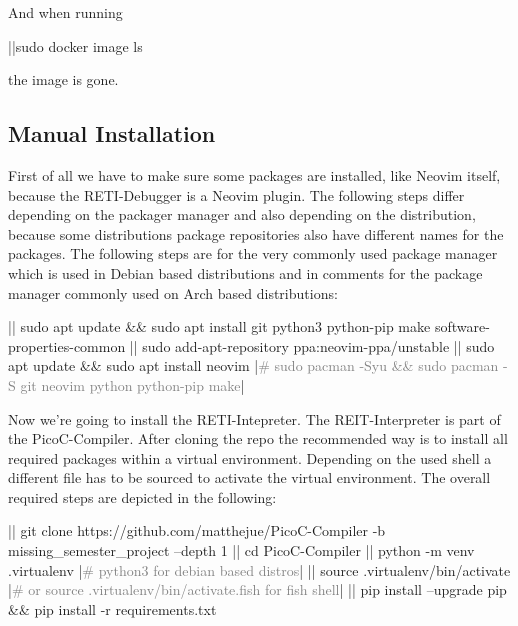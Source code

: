 \documentclass{report}
\begin{document}
And when running

\begin{terminal}
	|\prompt|sudo docker image ls
\end{terminal}

the image is gone.

\subsection{Manual Installation}
\label{sec:manual installation}

First of all we have to make sure some packages are installed, like Neovim itself, because the RETI-Debugger is a Neovim plugin. The following steps differ depending on the packager manager and also depending on the distribution, because some distributions package repositories also have different names for the packages. The following steps are for the very commonly used package manager  which is used in Debian based distributions and in comments for the  package manager commonly used on Arch based distributions:

\begin{terminal}
  |\prompt| sudo apt update && sudo apt install git python3 python-pip make 
     software-properties-common
  |\prompt| sudo add-apt-repository ppa:neovim-ppa/unstable
  |\prompt| sudo apt update && sudo apt install neovim
  |\textcolor{gray}{# sudo pacman -Syu && sudo pacman -S git neovim python python-pip make}|
\end{terminal}

Now we're going to install the RETI-Intepreter. The REIT-Interpreter is part of the PicoC-Compiler. After cloning the repo the recommended way is to install all required packages within a \alert{virtual environment}. Depending on the used \alert{shell} a different file has to be sourced to activate the virtual environment. The overall required steps are depicted in the following:

\begin{terminal}
|\prompt| git clone https://github.com/matthejue/PicoC-Compiler
   -b missing_semester_project --depth 1
|\prompt| cd PicoC-Compiler
|\prompt| python -m venv .virtualenv |\textcolor{gray}{# python3 for debian based distros}|
|\prompt| source .virtualenv/bin/activate
|\textcolor{gray}{# or source .virtualenv/bin/activate.fish for fish shell}|
|\prompt| pip install --upgrade pip && pip install -r requirements.txt
\end{terminal}
\end{document}
